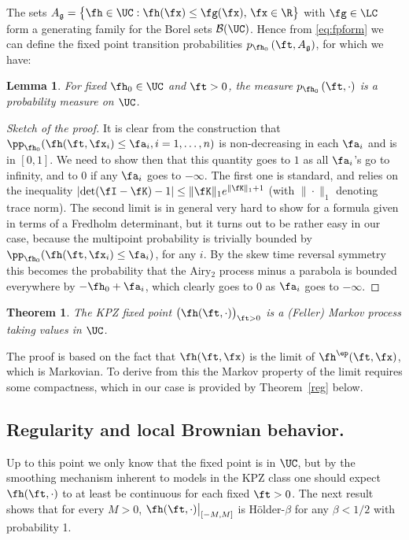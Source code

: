 \documentclass[]{pcmi}
\theoremstyle{plain}
\newtheorem{theorem}[equation]{Theorem}
\newtheorem{lemma}[equation]{Lemma}
\theoremstyle{definition}
\begin{document}
The sets $A_{\mathfrak{g}} = \bigl\{ \fh\in \UC:  \fh(\fx) \le \fg(\fx),\,\fx\in\R\bigr\}$ with $\fg\in\LC$ form a generating family for the Borel sets $\mathcal{B}(\UC)$.
Hence from \eqref{eq:fpform} we can define the fixed point transition probabilities $p_{\fh_0}\,(\ft, A_{\mathfrak{g}})$, for which we have:

\begin{lemma}
For fixed $\fh_0\in\UC$ and $\ft>0$, the measure $p_{\fh_0}\,(\ft, \cdot)$ is a probability measure on $\UC$.
\end{lemma}

\begin{proof}[Sketch of the proof]
It is clear from the construction that $\pp_{\fh_0}( \fh(\ft, \fx_i) \le \fa_i, i=1,\ldots,n)$ is non-decreasing in each $\fa_i$ and is in $[0,1]$.
We need to show then that this quantity goes to $1$ as all $\fa_i$'s go to infinity, and to $0$ if any $\fa_i$ goes to $-\infty$.
The first one is standard, and relies on the inequality $\left|\det(\fI-\fK) - 1\right|\leq\|\fK\|_1e^{\|\fK\|_1+1}$ (with $\|\cdot\|_1$ denoting trace norm).
The second limit is in general very hard to show for a formula given in terms of a Fredholm determinant, but it turns out to be rather easy in our case, because the multipoint probability is trivially bounded by $\pp_{\fh_0}( \fh(\ft, \fx_i) \le \fa_i)$, for any $i$.  By the skew time reversal symmetry this becomes the probability that the Airy$_2$ process minus a parabola is bounded everywhere by $-\fh_0+\fa_i$, which clearly
goes to $0$ as $\fa_i$ goes to $-\infty$.
\end{proof}

\begin{theorem}\label{thm:markovprop}
  The KPZ fixed point $\big(\fh(\ft,\cdot)\big)_{\ft>0}$ is a (Feller) Markov process taking values in $\UC$.
\end{theorem}

\noindent The proof is based on the fact that $\fh(\ft,\fx)$ is the limit of $\fh^\ep(\ft,\fx)$, which is Markovian.
To derive from this the Markov property of the limit requires some compactness, which in our case is provided by Theorem~\ref{reg} below.

\subsection{Regularity and local Brownian behavior.}

Up to this point we only know that the fixed point is in $\UC$, but by the smoothing mechanism inherent to models in the KPZ class one should expect $\fh(\ft,\cdot)$
to at least be continuous for each fixed $\ft>0$.
The next result shows that for every $M>0$, $\fh(\ft,\cdot)\big|_{[-M,M]}$ is H\"older-$\beta$ for any $\beta<1/2$ with probability 1.
\end{document}
